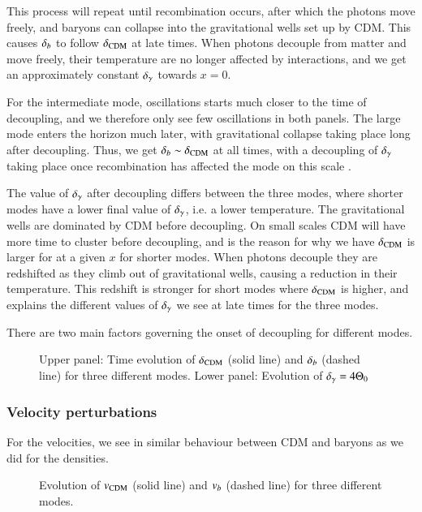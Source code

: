This process will repeat until recombination occurs, after which the photons move freely, and baryons can collapse into the gravitational wells set up by CDM. This causes $\delta_b$ to follow $\delta_\mathrm{CDM}$ at late times. When photons decouple from matter and move freely, their temperature are no longer affected by interactions, and we get an approximately constant $\delta_\gamma$ towards $x=0$.  

For the intermediate mode, oscillations starts much closer to the time of decoupling, and we therefore only see few oscillations in both panels. The large mode enters the horizon much later, with gravitational collapse taking place long after decoupling. Thus, we get $\delta_b\sim\delta_\mathrm{CDM}$ at all times, with a decoupling of $\delta_\gamma$ taking place once recombination has affected the mode on this scale . 

The value of $\delta_\gamma$ after decoupling differs between the three modes, where shorter modes have a lower final value of $\delta_\gamma$, i.e. a lower temperature. The gravitational wells are dominated by CDM before decoupling. On small scales CDM will have more time to cluster before decoupling, and is the reason for why we have $\delta_\mathrm{CDM}$ is larger for at a given $x$ for shorter modes. When photons decouple they are redshifted as they climb out of gravitational wells, causing a reduction in their temperature. This redshift is stronger for short modes where $\delta_\mathrm{CDM}$ is higher, and explains the different values of $\delta_\gamma$ we see at late times for the three modes. 

There are two main factors governing the onset of decoupling for different modes.  

\begin{figure}[ht!]
    \caption{Upper panel: Time evolution of $\delta_\mathrm{CDM}$ (solid line) and $\delta_b$ (dashed line) for three different modes. Lower panel: Evolution of $\delta_\gamma=4\Theta_0$}
    \label{fig:M3:results:deltas}
\end{figure}


\subsubsection{Velocity perturbations}\label{sssec:M3:results:velocity_perturbations}
For the velocities, we see in  similar behaviour between CDM and baryons as we did for the densities. 

\begin{figure}[ht!]
    \caption{Evolution of $v_\mathrm{CDM}$ (solid line) and $v_b$ (dashed line) for three different modes.}
    \label{fig:M3:results:vel_CDM_b}
\end{figure}


